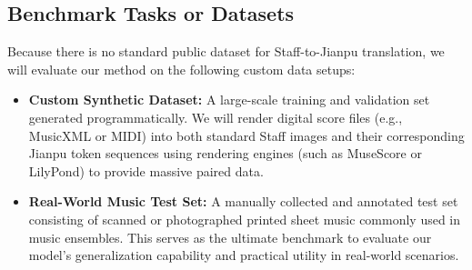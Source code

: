 \subsection{Benchmark Tasks or Datasets}

Because there is no standard public dataset for Staff-to-Jianpu translation, we will evaluate our method on the following custom data setups:
\begin{itemize}
    \item \textbf{Custom Synthetic Dataset:} A large-scale training and validation set generated programmatically. We will render digital score files (e.g., MusicXML or MIDI) into both standard Staff images and their corresponding Jianpu token sequences using rendering engines (such as MuseScore or LilyPond) to provide massive paired data.
    \item \textbf{Real-World Music Test Set:} A manually collected and annotated test set consisting of scanned or photographed printed sheet music commonly used in music ensembles. This serves as the ultimate benchmark to evaluate our model's generalization capability and practical utility in real-world scenarios.
\end{itemize}
